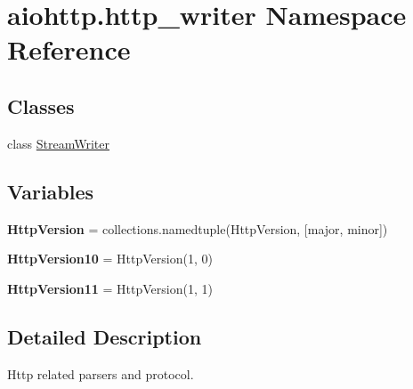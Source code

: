 \hypertarget{namespaceaiohttp_1_1http__writer}{}\section{aiohttp.\+http\+\_\+writer Namespace Reference}
\label{namespaceaiohttp_1_1http__writer}
\subsection*{Classes}
\begin{DoxyCompactItemize}
\item 
class \hyperlink{classaiohttp_1_1http__writer_1_1_stream_writer}{Stream\+Writer}
\end{DoxyCompactItemize}
\subsection*{Variables}
\begin{DoxyCompactItemize}
\item 
\mbox{\label{namespaceaiohttp_1_1http__writer_a43044cf172ca17b828ec9f941cec14d8}} 
{\bfseries Http\+Version} = collections.\+namedtuple(\textquotesingle{}Http\+Version\textquotesingle{}, \mbox{[}\textquotesingle{}major\textquotesingle{}, \textquotesingle{}minor\textquotesingle{}\mbox{]})
\item 
\mbox{\label{namespaceaiohttp_1_1http__writer_a049a0a0be3fc753a29db74e27ca3f8cc}} 
{\bfseries Http\+Version10} = Http\+Version(1, 0)
\item 
\mbox{\label{namespaceaiohttp_1_1http__writer_ae93c3af7a8ee18a48be87637fb21397a}} 
{\bfseries Http\+Version11} = Http\+Version(1, 1)
\end{DoxyCompactItemize}


\subsection{Detailed Description}
\begin{DoxyVerb}Http related parsers and protocol.\end{DoxyVerb}
 